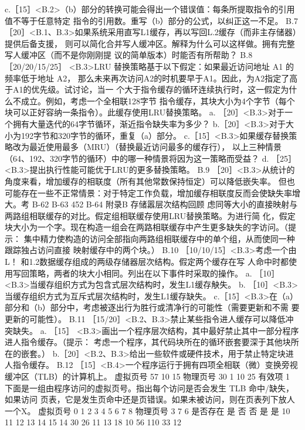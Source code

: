 c.［15］<B.2>（b）部分的转换可能会得出一个错误值：每条所提取指令的引用值不等于任意特定
指令的引用数。重写（b）部分的公式，以纠正这一不足。
B.7
［20］<B.1、B.3>如果系统采用直写L1缓存，再以写回L.2缓存（而非主存储器）提供后备支援，
则可以简化合并写人缓冲区。解释为什么可以这样做。拥有完整写人缓冲区（而不是你刚刚提
议的简单版本）时能否有所帮助？
B.8
［20/20/15/25］ <B.3>LRU 替换策略基于以下假定：如果最近访问地址 A1 的频率低于地址 A2，
那么未来再次访问A2的时机要早于A1。因此，为A2指定了高于A1的优先级。试讨论，当一
个大于指令缓存的循环连续执行时，这一假定为什么不成立。例如，考虑一个全相联128字节
指令缓存，其块大小为4个字节（每个块可以正好容纳一条指令）。此缓存使用LRU替换策略。
a. ［20］<B.3>对于一个拥有大量迭代的64字节循环，渐近指令缺失率为多少？
b.［20］<B.3>对于大小为192字节和320字节的循环，重复（a）部分。
c.［15］<B.3>如果缓存替换策略改为最近使用最多（MRU）（替换最近访问最多的缓存行），
以上三种情景（64、192、320字节的循环）中的哪一种情景将因为这一策略而受益？
d. ［25］ <B.3>提出执行性能可能优于LRU的更多替換策略。
B.9
［20］<B.3>从统计的角度来看，增加缓存的相联度（所有其他常数保持恒定）可以降低嵌失率。
但也可能存在一些不正常情景：对于特定工作负载，增加缓存相联度反而会使缺失率增大。考
B-62
B-63
452
B-64
附录B 存储嚣层次结构回顾
虑同等大小的直接映射与两路组相联缓存的对比。假定组相联缓存使用LRU替换策略。为进行简
化，假定块大小为一个字。现在构造一组会在两路相联缓存中产生更多缺失的字访问。（提示：
集中精力使构造的访问全部指向两路组相联缓存中的单个组，从而使同一种跟踪独占访问直接
映射缓存中的两个块。）
B.10 ［10/10/15］<B.3>考虑一个由L！ 和1.2数据缓存组成的两级存储器层次结构。假定两个缓存在写
人命中时都使用写回策略，两者的块大小相同。列出在以下事件时采取的操作。
a. ［10］<B.3>当缓存组织方式为包含式层次结构时，发生L1缓存觖失。
b. ［10］<B.3>当缓存组织方式为互斥式层次结构时，发生L1缓存缺失。
c.［15］<B.3>在（a）部分和（b）部分中，考虑被逐出行为胜行或清净行的可能性（需要更新和不需
要更新的可能性）。
B.11 ［15/20］<B.2、B.3>禁止某些指令进人缓存可以降低冲突缺失。
a. ［15］ <B.3>画出一个程序层次结构，其中最好禁止其中一部分程序进人指令缓存。（提示：
考虑一个程序，其代码块所在的循环嵌套要深于其他块所在的嵌套。）
b.［20］<B.2、B.3>给出一些软件或硬件技术，用于禁止特定块进人指令缓存。
B.12 ［15］<B.4>一个程序运行于拥有四项全相联（微）变换旁视缓冲区（TLB）的计算机上。
虚拟页号
57
10
15
物理页号
30
1
10
25
有效项
1
下面是一组由程序访问的虚拟页号。指出每个访问是否会发生 TLB 命中/缺失，如果访问
页表，它是发生页命中还是页错误。如果未被访问，则在页表列下放人一个X。
虚拟页号
0
1
2
3
4
5
6
7
8
物理页号
3
7
6
是否存在
是
否
否
是
是
10
11
12
13
14
15
14
30
26
11
13
18
10
56
110
33
12
